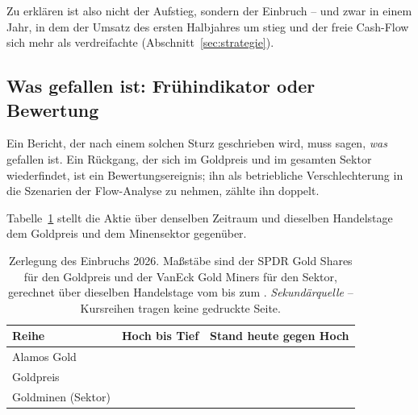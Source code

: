 Zu erkl\"aren ist also nicht der Aufstieg, sondern der Einbruch -- und zwar
in einem Jahr, in dem der Umsatz des ersten Halbjahres um
\Pct{\HJUmsatzDelta} stieg und der freie Cash-Flow sich mehr als
verdreifachte (Abschnitt~\ref{sec:strategie}).

\subsection{Was gefallen ist: Fr\"uhindikator oder Bewertung}
\label{sec:zerlegung}

Ein Bericht, der nach einem solchen Sturz geschrieben wird, muss sagen,
\emph{was} gefallen ist. Ein R\"uckgang, der sich im Goldpreis und im
gesamten Sektor wiederfindet, ist ein Bewertungsereignis; ihn als
betriebliche Verschlechterung in die Szenarien der Flow-Analyse zu nehmen,
z\"ahlte ihn doppelt.

Tabelle~\ref{tab:zerlegung} stellt die Aktie \"uber denselben Zeitraum und
dieselben Handelstage dem Goldpreis und dem Minensektor gegen\"uber.

\begin{table}[htbp]
\centering
\caption{Zerlegung des Einbruchs 2026. Ma{\ss}st\"abe sind der SPDR Gold
Shares f\"ur den Goldpreis und der VanEck Gold Miners f\"ur den Sektor,
gerechnet \"uber dieselben Handelstage vom \EinbruchTagHoch{} bis zum
\EinbruchTagTief{}. \emph{Sekund\"arquelle} -- Kursreihen tragen keine
gedruckte Seite.}
\label{tab:zerlegung}
\begin{tabular}{lrr}
\toprule
Reihe & Hoch bis Tief & Stand heute gegen Hoch\\
\midrule
Alamos Gold & \Pct{\EinbruchAktie} & \Pct{\AbstandAktie}\\
Goldpreis & \Pct{\EinbruchGold} & \Pct{\AbstandGold}\\
Goldminen (Sektor) & \Pct{\EinbruchSektor} & \Pct{\AbstandSektor}\\
\bottomrule
\end{tabular}
\end{table}

\FloatBarrier

